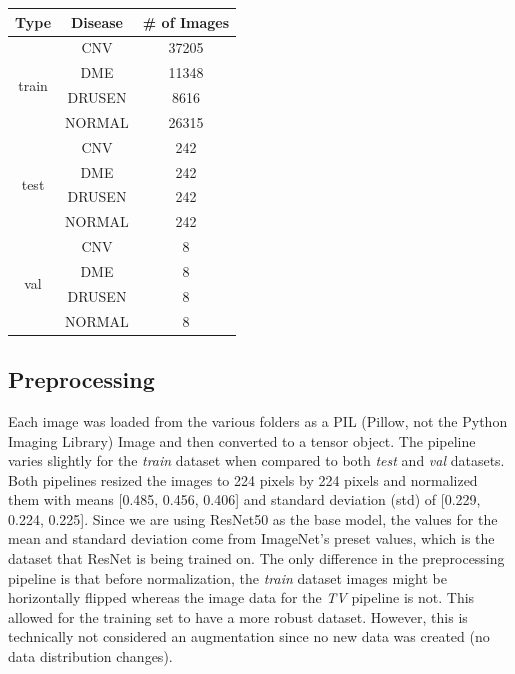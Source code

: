 \documentclass[11pt]{article}
\begin{document}
\begin{center}
  \begin{tabular}{|c|c|c|}
    \hline
    \textbf{Type}          & \textbf{Disease} & \textbf{\# of Images} \\
    \hline
    \multirow{4}{*}{train} & CNV              & 37205                 \\ \cline{2-3}
                           & DME              & 11348                 \\ \cline{2-3}
                           & DRUSEN           & 8616                  \\ \cline{2-3}
                           & NORMAL           & 26315                 \\
    \hline
    \multirow{4}{*}{test}  & CNV              & 242                   \\ \cline{2-3}
                           & DME              & 242                   \\ \cline{2-3}
                           & DRUSEN           & 242                   \\ \cline{2-3}
                           & NORMAL           & 242                   \\
    \hline
    \multirow{4}{*}{val}   & CNV              & 8                     \\ \cline{2-3}
                           & DME              & 8                     \\ \cline{2-3}
                           & DRUSEN           & 8                     \\ \cline{2-3}
                           & NORMAL           & 8                     \\
    \hline
  \end{tabular}
\end{center}



\subsection{Preprocessing}

Each image was loaded from the various folders as a PIL (Pillow, not the Python Imaging Library) Image and then converted to a tensor object. The pipeline varies slightly for the \textit{train} dataset when compared to both \textit{test} and \textit{val} datasets. Both pipelines resized the images to 224 pixels by 224 pixels and normalized them with means [0.485, 0.456, 0.406] and standard deviation (std) of [0.229, 0.224, 0.225]. Since we are using ResNet50 as the base model, the values for the mean and standard deviation come from ImageNet's preset values, which is the dataset that ResNet is being trained on. The only difference in the preprocessing pipeline is that before normalization, the \textit{train} dataset images might be horizontally flipped whereas the image data for the \textit{TV} pipeline is not. This allowed for the training set to have a more robust dataset. However, this is technically not considered an augmentation since no new data was created (no data distribution changes).
\end{document}
